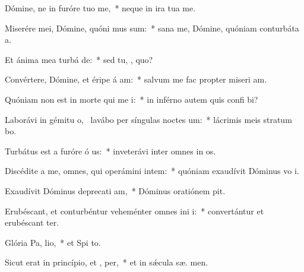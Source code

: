 \item Dómine, ne in furóre tuo  me,~* neque in ira tua  me.
\item Miserére mei, Dómine, quóni mus sum:~* sana me, Dómine, quóniam conturbáta   a.
\item Et ánima mea turbá  de:~* sed tu, , quo?
\item Convértere, Dómine, et éripe á am:~* salvum me fac propter miseri am.
\item Quóniam non est in morte qui me  i:~* in inférno autem quis confi bi?
\item Laborávi in gémitu o,~\pscross{} lavábo per síngulas noctes  um:~* lácrimis meis stratum  bo.
\item Turbátus est a furóre ó us:~* inveterávi inter omnes in os.
\item Discédite a me, omnes, qui operámini intem:~* quóniam exaudívit Dóminus vo  i.
\item Exaudívit Dóminus deprecati am,~* Dóminus oratiónem  pit.
\item Erubéscant, et conturbéntur veheménter omnes ini i:~* convertántur et erubéscant  ter.
\item Glória Pa,  lio,~* et Spi to.
\item Sicut erat in princípio, et ,  per,~* et in sǽcula sæ. men.

